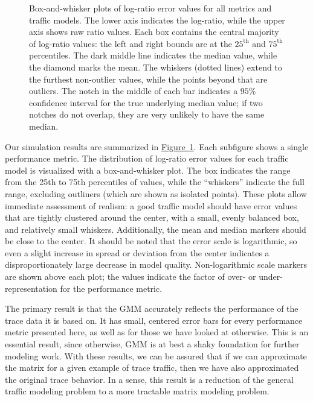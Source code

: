 \documentclass[twocolumn,final]{svjour3}
\newcommand{\caps}[1]{{\small{#1}}}
\newcommand{\Figure}[1]{\hyperref[fig:#1]{Figure~\ref*{fig:#1}}}
\begin{document}
\begin{figure}
%
\caption{Box-and-whisker plots of log-ratio error values for all metrics and traffic models. The lower axis indicates the log-ratio, while the upper axis shows raw ratio values. Each box contains the central majority of log-ratio values: the left and right bounds are at the $25^\text{th}$ and $75^\text{th}$ percentiles. The dark middle line indicates the median value, while the diamond marks the mean. The whiskers (dotted lines) extend to the furthest non-outlier values, while the points beyond that are outliers. The notch in the middle of each bar indicates a $95\%$ confidence interval for the true underlying median value; if two notches do not overlap, they are very unlikely to have the same median.}
\label{fig:box-plots}
\end{figure}

Our simulation results are summarized in \Figure{box-plots}. Each subfigure shows a single performance metric. The distribution of log-ratio error values for each traffic model is visualized with a box-and-whisker plot. The box indicates the range from the 25th to 75th percentiles of values, while the ``whiskers'' indicate the full range, excluding outliners (which are shown as isolated points). These plots allow immediate assessment of realism: a good traffic model should have error values that are tightly clustered around the center, with a small, evenly balanced box, and relatively small whiskers. Additionally, the mean and median markers should be close to the center. It should be noted that the error scale is logarithmic, so even a slight increase in spread or deviation from the center indicates a disproportionately large decrease in model quality. Non-logarithmic scale markers are shown above each plot; the values indicate the factor of over- or under-representation for the performance metric.

The primary result is that the \caps{GMM} accurately reflects the performance of the trace data it is based on. It has small, centered error bars for every performance metric presented here, as well as for those we have looked at otherwise. This is an essential result, since otherwise, \caps{GMM} is at best a shaky foundation for further modeling work. With these results, we can be assured that if we can approximate the matrix for a given example of trace traffic, then we have also approximated the original trace behavior. In a sense, this result is a reduction of the general traffic modeling problem to a more tractable matrix modeling problem.
\end{document}
